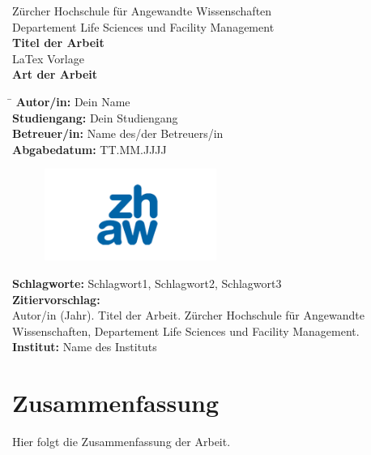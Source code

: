 \documentclass[a4paper,12pt,twoside]{article}
\begin{document}
	
	\begin{titlepage}
		\centering
		{\Large Zürcher Hochschule für Angewandte Wissenschaften\\
			Departement Life Sciences und Facility Management\\[2cm]}
		{\Large \textbf{Titel der Arbeit}\\[1cm]}
		{\large LaTex Vorlage\\[1cm]}
		{\large \textbf{Art der Arbeit}\\[1cm]}
		\begin{tabbing}
			\hspace*{6cm} \= \kill
			\textbf{Autor/in:}    \> Dein Name\\
			\textbf{Studiengang:} \> Dein Studiengang\\
			\textbf{Betreuer/in:} \> Name des/der Betreuers/in\\
			\textbf{Abgabedatum:} \> TT.MM.JJJJ
		\end{tabbing}
		\vfill
	\begin{figure}[t]
		\raggedleft
		\includegraphics[width=0.5\textwidth]{zhawGR_logo.png} %
		\end{figure}
	\end{titlepage}
	
	\newpage
	\thispagestyle{empty}
	\noindent
	
	\textbf{Schlagworte:} Schlagwort1, Schlagwort2, Schlagwort3\\[1cm]
	\textbf{Zitiervorschlag:}\\
	Autor/in (Jahr). Titel der Arbeit. Zürcher Hochschule für Angewandte Wissenschaften, Departement Life Sciences und Facility Management.\\[1cm]
	\textbf{Institut:} Name des Instituts
	
	\newpage
	\section*{Zusammenfassung}
	Hier folgt die Zusammenfassung der Arbeit.
	
	\newpage
\end{document}
